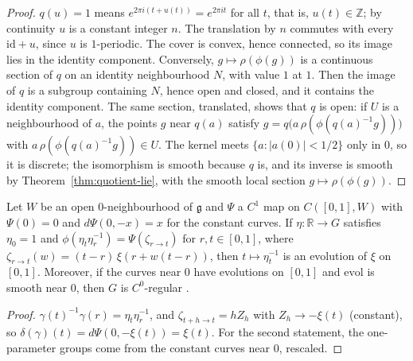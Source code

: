 \begin{proof}
  \leanok
  $q(u) = 1$ means $e^{2\pi i(t + u(t))} = e^{2\pi i t}$ for all $t$, that is, $u(t) \in \mathbb Z$;
  by continuity $u$ is a constant integer $n$. The translation by $n$ commutes with every
  $\mathrm{id} + u$, since $u$ is $1$-periodic. The cover is convex, hence connected, so its image
  lies in the identity component. Conversely, $g \mapsto \rho(\phi(g))$ is a continuous section of
  $q$ on an identity neighbourhood $N$, with value $1$ at $1$. Then the image of $q$ is a subgroup
  containing $N$, hence open and closed, and it contains the identity component. The same section,
  translated, shows that $q$ is open: if $U$ is a neighbourhood of $a$, the points
  $g$ near $q(a)$ satisfy $g = q\big(a\,\rho(\phi(q(a)^{-1} g))\big)$ with
  $a\,\rho(\phi(q(a)^{-1} g)) \in U$. The kernel meets $\{a : |a(0)| < 1/2\}$ only in $0$, so it is
  discrete; the isomorphism is smooth because $q$ is, and its inverse is smooth by
  Theorem~\ref{thm:quotient-lie}, with the smooth local section $g \mapsto \rho(\phi(g))$.
\end{proof}

\begin{lemma}
  \label{lem:evol-from-flow}
  \leanok
  Let $W$ be an open $0$-neighbourhood of $\mathfrak g$ and $\Psi$ a $C^1$ map on
  $C([0, 1], W)$ with $\Psi(0) = 0$ and $d\Psi(0, -x) = x$ for the constant curves. If
  $\eta \colon \mathbb R \to G$ satisfies $\eta_0 = 1$ and
  $\phi(\eta_t \eta_r^{-1}) = \Psi(\zeta_{r \to t})$ for $r, t \in [0, 1]$, where
  $\zeta_{r \to t}(w) = (t - r)\,\xi(r + w(t - r))$, then $t \mapsto \eta_t^{-1}$ is an evolution
  of $\xi$ on $[0, 1]$. Moreover, if the curves near $0$ have evolutions on $[0, 1]$ and
  $\mathrm{evol}$ is smooth near $0$, then $G$ is $C^0$-regular \cite[Lemma 6.1.4]{GN26}.
\end{lemma}

\begin{proof}
  \leanok
  $\gamma(t)^{-1}\gamma(r) = \eta_t\eta_r^{-1}$, and $\zeta_{t + h \to t} = h Z_h$ with
  $Z_h \to -\xi(t)$ (constant), so $\delta(\gamma)(t) = d\Psi(0, -\xi(t)) = \xi(t)$. For the
  second statement, the one-parameter groups come from the constant curves near $0$, rescaled.
\end{proof}

